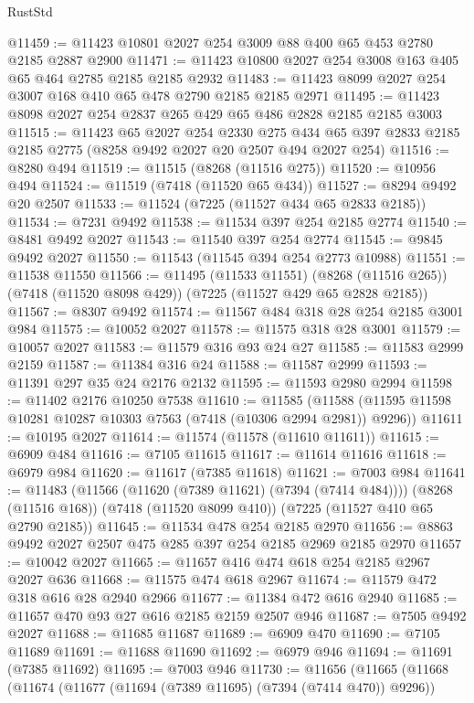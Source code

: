 \begin{lexlean}{RustStd}
\begin{coremodule}
@11459 := @11423 @10801 @2027 @254 @3009 @88 @400 @65 @453 @2780 @2185 @2887 @2900
@11471 := @11423 @10800 @2027 @254 @3008 @163 @405 @65 @464 @2785 @2185 @2185 @2932
@11483 := @11423 @8099 @2027 @254 @3007 @168 @410 @65 @478 @2790 @2185 @2185 @2971
@11495 := @11423 @8098 @2027 @254 @2837 @265 @429 @65 @486 @2828 @2185 @2185 @3003
@11515 := @11423
    @65
    @2027
    @254
    @2330
    @275
    @434
    @65
    @397
    @2833
    @2185
    @2185
    @2775
    (@8258 @9492 @2027 @20 @2507 @494 @2027 @254)
@11516 := @8280 @494
@11519 := @11515 (@8268 (@11516 @275))
@11520 := @10956 @494
@11524 := @11519 (@7418 (@11520 @65 @434))
@11527 := @8294 @9492 @20 @2507
@11533 := @11524 (@7225 (@11527 @434 @65 @2833 @2185))
@11534 := @7231 @9492
@11538 := @11534 @397 @254 @2185 @2774
@11540 := @8481 @9492 @2027
@11543 := @11540 @397 @254 @2774
@11545 := @9845 @9492 @2027
@11550 := @11543 (@11545 @394 @254 @2773 @10988)
@11551 := @11538 @11550
@11566 := @11495
    (@11533 @11551)
    (@8268 (@11516 @265))
    (@7418 (@11520 @8098 @429))
    (@7225 (@11527 @429 @65 @2828 @2185))
@11567 := @8307 @9492
@11574 := @11567 @484 @318 @28 @254 @2185 @3001 @984
@11575 := @10052 @2027
@11578 := @11575 @318 @28 @3001
@11579 := @10057 @2027
@11583 := @11579 @316 @93 @24 @27
@11585 := @11583 @2999 @2159
@11587 := @11384 @316 @24
@11588 := @11587 @2999
@11593 := @11391 @297 @35 @24 @2176 @2132
@11595 := @11593 @2980 @2994
@11598 := @11402 @2176 @10250 @7538
@11610 := @11585
    (@11588 (@11595 @11598 @10281 @10287 @10303 @7563 (@7418 (@10306 @2994 @2981)) @9296))
@11611 := @10195 @2027
@11614 := @11574 (@11578 (@11610 @11611))
@11615 := @6909 @484
@11616 := @7105 @11615
@11617 := @11614 @11616
@11618 := @6979 @984
@11620 := @11617 (@7385 @11618)
@11621 := @7003 @984
@11641 := @11483
    (@11566 (@11620 (@7389 @11621) (@7394 (@7414 @484))))
    (@8268 (@11516 @168))
    (@7418 (@11520 @8099 @410))
    (@7225 (@11527 @410 @65 @2790 @2185))
@11645 := @11534 @478 @254 @2185 @2970
@11656 := @8863 @9492 @2027 @2507 @475 @285 @397 @254 @2185 @2969 @2185 @2970
@11657 := @10042 @2027
@11665 := @11657 @416 @474 @618 @254 @2185 @2967 @2027 @636
@11668 := @11575 @474 @618 @2967
@11674 := @11579 @472 @318 @616 @28 @2940 @2966
@11677 := @11384 @472 @616 @2940
@11685 := @11657 @470 @93 @27 @616 @2185 @2159 @2507 @946
@11687 := @7505 @9492 @2027
@11688 := @11685 @11687
@11689 := @6909 @470
@11690 := @7105 @11689
@11691 := @11688 @11690
@11692 := @6979 @946
@11694 := @11691 (@7385 @11692)
@11695 := @7003 @946
@11730 := @11656
    (@11665
      (@11668
        (@11674
          (@11677 (@11694 (@7389 @11695) (@7394 (@7414 @470)) @9296))

\end{coremodule}
\end{lexlean}
